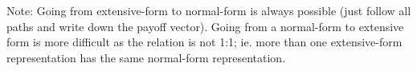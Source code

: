 Note: Going from extensive-form to normal-form is always possible (just follow all paths and write down the payoff vector). Going from a normal-form to extensive form is more difficult as the relation is not 1:1; ie. more than one extensive-form representation has the same normal-form representation.


